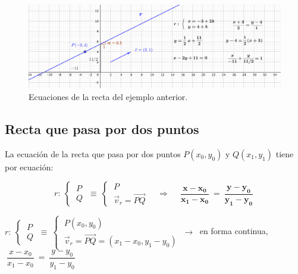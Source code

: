 \vspace{0.5cm}
\begin{figure}[H]
	\centering
	\includegraphics[width=1\textwidth]{img-ga/ga16.png}
	\caption*{\footnotesize{\textcolor{gris}{Ecuaciones de la recta del ejemplo anterior.}}}
\end{figure}

\vspace{5mm}
\subsection{Recta que pasa por dos puntos}
\vspace{0.5cm}

\begin{theorem}

	\normalsize{La} ecuación de la recta que pasa por dos puntos $P(x_0,y_0) \text{ y } Q(x_1,y_1)$ tiene por ecuación:
	
	$$r:\ \begin{cases} \ P \\ \ Q \end{cases} \ \equiv \ \begin{cases} \ P \\ \ \vec v_r=\overrightarrow{PQ} \end{cases} \quad \Rightarrow \quad   \boxed{ \ \boldsymbol{ \dfrac{x-x_0}{x_1-x_0} \ = \ \dfrac{y-y_0}{y_1-y_0} } \ }$$
\end{theorem}
$r:\ \begin{cases} \ P \\ \ Q \end{cases} \ \equiv \ \begin{cases} \ P(x_0,y_0) \\ \ \vec v_r=\overrightarrow{PQ}=(x_1-x_0,y_1-y_0) \end{cases} \ \to \ $ en forma continua, $\ \dfrac{x-x_0}{x_1-x_0} \ = \ \dfrac{y-y_0}{y_1-y_0} $\QED


